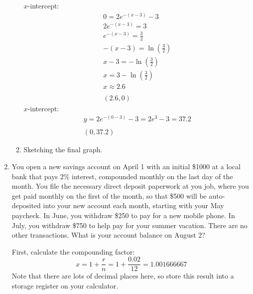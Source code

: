 \documentclass[letterpaper,12pt,fleqn]{article}
\begin{document}
\begin{enumerate}
\begin{enumerate}
    \(x\)-intercept:
    \begin{gather*}
      0=2e^{-(x-3)}-3 \\
      2e^{-(x-3)}=3 \\
      e^{-(x-3)}=\frac{3}{2} \\
      -(x-3)=\ln\left(\frac{3}{2}\right) \\
      x-3=-\ln\left(\frac{3}{2}\right) \\
      x=3-\ln\left(\frac{3}{2}\right) \\
      x\approx2.6 \\
      \\
      (2.6,0)
    \end{gather*}
    \(x\)-intercept:
    \begin{gather*}
      y=2e^{-(0-3)}-3=2e^3-3=37.2 \\
      \\
      (0,37.2)
    \end{gather*}
  \item Sketching the final graph.

  \end{enumerate}

\item You open a new savings account on April 1 with an initial \$1000 at a local bank that pays 2\% interest, compounded
  monthly on the last day of the month.  You file the necessary direct deposit paperwork at you job, where you get paid
  monthly on the first of the month, so that \$500 will be auto-deposited into your new account each month, starting with
  your May paycheck.  In June, you withdraw \$250 to pay for a new mobile phone.  In July, you withdraw \$750 to help pay
  for your summer vacation.  There are no other transactions.  What is your account balance on August 2?

  First, calculate the compounding factor:
  \[x=1+\frac{r}{n}=1+\frac{0.02}{12}=1.001666667\]
  Note that there are lots of decimal places here, so store this result into a storage register on your calculator.


\end{enumerate}
\end{document}
